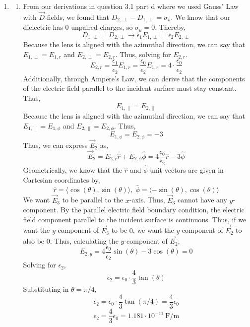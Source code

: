 \documentclass[12pt]{article}
\begin{document}
\begin{enumerate}
\begin{enumerate}
		\item [e.]
		\[\frac{C}{A} = \frac{1}{A}\cdot \frac{dQ}{dV} = \frac{d\sigma}{dV}=\frac{\epsilon \epsilon_0}{\epsilon_0 t + \epsilon(d-t)}\]
		\[\boxed{C=\frac{\epsilon \epsilon_0}{\epsilon_0 t + \epsilon(d-t)}}\]

	\end{enumerate}

	\item [3.2]
	\begin{enumerate}
		\item [a.]
		From our derivations in question 3.1 part d where we used Gauss' Law with $\vec D$-fields, we found that $D_{2,\perp}-D_{1,\perp}=\sigma_u$.
		We know that our dielectric has 0 unpaired charges, so $\sigma_u=0$.
		Thereby,
		\[D_{1,\perp}=D_{2,\perp}\to \epsilon_1 E_{1,\perp}=\epsilon_2  E_{2,\perp}\]
		Because the lens is aligned with the azimuthal direction, we can say that $E_{1,\perp}=E_{1,r}$ and $E_{2,\perp}=E_{2,r}$.
		Thus, solving for $E_{2,r}$.
		\[E_{2,r}=\frac{\epsilon_1}{\epsilon_2}E_{1,r}=\frac{\epsilon_0}{\epsilon_2}E_{1,r}=4\cdot \frac{\epsilon_0}{\epsilon_2}\]
		Additionally, through Ampere's Law, we can derive that the components of the electric field parallel to the incident surface must stay constant.
		Thus,
		\[E_{1,\parallel}=E_{2,\parallel}\]
		Because the lens is aligned with the azimuthal direction, we can say that $E_{1,\parallel}=E_{1,\phi}$ and $E_{2,\parallel}=E_{2,\phi}$.
		Thus,
		\[E_{1,\phi}=E_{2,\phi}=-3\]
		Thus, we can express $\vec E_2$ as,
		\[\vec E_2 = E_{2,r}\hat r + E_{2,\phi}\hat \phi = 4\frac{\epsilon_0}{\epsilon_2}\hat r -3 \hat \phi\]
		Geometrically, we know that the $\hat r$ and $\hat \phi$ unit vectors are given in Cartesian coordinates by,
		\[\hat r=\langle \cos(\theta),\sin(\theta)\rangle, \; \hat \phi = \langle -\sin(\theta),\cos(\theta)\rangle\]
		We want $\vec E_3$ to be parallel to the $x$-axis.
		Thus, $\vec E_3$ cannot have any $y$-component.
		By the parallel electric field boundary condition, the electric field component parallel to the incident surface is continuous.
		Thus, if we want the $y$-component of $\vec E_3$ to be $0$, we want the $y$-component of $\vec E_2$ to also be $0$.
		Thus, calculating the $y$-component of $\vec E_2$,
		\[E_{2,y}=4\frac{\epsilon_0}{\epsilon_2}\sin(\theta)-3\cos(\theta)=0\]
		Solving for $\epsilon_2$,
		\[\epsilon_2 = \epsilon_0\cdot\frac{4}{3}\tan(\theta)\]
		Substituting in $\theta = \pi/4$,
		\[\epsilon_2 = \epsilon_0\cdot \frac{4}{3}\tan(\pi/4)=\frac{4}{3}\epsilon_0\]
		\[\boxed{\epsilon_2 = \frac{4}{3}\epsilon_0=1.181\cdot10^{-11}\:\mathrm{F/m}}\]


\end{enumerate}
\end{enumerate}
\end{document}
